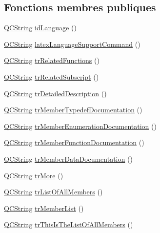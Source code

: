 \subsection*{Fonctions membres publiques}
\begin{DoxyCompactItemize}
\item 
\hyperlink{class_q_c_string}{Q\+C\+String} \hyperlink{class_translator_dutch_aa43227f39ea2263932f49f851b350ea5}{id\+Language} ()
\item 
\hyperlink{class_q_c_string}{Q\+C\+String} \hyperlink{class_translator_dutch_a325c81f044aba5c86da2e2741a092119}{latex\+Language\+Support\+Command} ()
\item 
\hyperlink{class_q_c_string}{Q\+C\+String} \hyperlink{class_translator_dutch_a9d8d21cbfa775b29b58c7b92de220959}{tr\+Related\+Functions} ()
\item 
\hyperlink{class_q_c_string}{Q\+C\+String} \hyperlink{class_translator_dutch_aca493128ac9113eb36d54de5d59dd308}{tr\+Related\+Subscript} ()
\item 
\hyperlink{class_q_c_string}{Q\+C\+String} \hyperlink{class_translator_dutch_af8b3e4701a4307f36ec8893112d26ff4}{tr\+Detailed\+Description} ()
\item 
\hyperlink{class_q_c_string}{Q\+C\+String} \hyperlink{class_translator_dutch_ab3fbe35a840c10ff8bd8823f026f7673}{tr\+Member\+Typedef\+Documentation} ()
\item 
\hyperlink{class_q_c_string}{Q\+C\+String} \hyperlink{class_translator_dutch_a37d85a35da1541a40c14fd24c0d485ca}{tr\+Member\+Enumeration\+Documentation} ()
\item 
\hyperlink{class_q_c_string}{Q\+C\+String} \hyperlink{class_translator_dutch_a13fe45656ab869d15e0b573af4c00df7}{tr\+Member\+Function\+Documentation} ()
\item 
\hyperlink{class_q_c_string}{Q\+C\+String} \hyperlink{class_translator_dutch_a73e4d80bbf93df9b21c2fa6c22dfde4a}{tr\+Member\+Data\+Documentation} ()
\item 
\hyperlink{class_q_c_string}{Q\+C\+String} \hyperlink{class_translator_dutch_a480ac5c1827eef4229e15db9a4c6319d}{tr\+More} ()
\item 
\hyperlink{class_q_c_string}{Q\+C\+String} \hyperlink{class_translator_dutch_aa9244461bd04414c966e2f15fa089198}{tr\+List\+Of\+All\+Members} ()
\item 
\hyperlink{class_q_c_string}{Q\+C\+String} \hyperlink{class_translator_dutch_af401bddc854fba9fbc72711bb9162721}{tr\+Member\+List} ()
\item 
\hyperlink{class_q_c_string}{Q\+C\+String} \hyperlink{class_translator_dutch_ada8a9f10a24ba592db8d37b3996c8f0f}{tr\+This\+Is\+The\+List\+Of\+All\+Members} ()

\end{DoxyCompactItemize}
